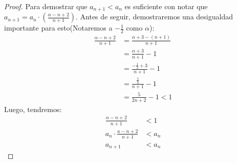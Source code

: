 \documentclass[../main.tex]{subfiles}
\begin{document}
\begin{partes}
\begin{proof}
        Para demostrar que $a_{n+1} < a_n$ es suficiente con notar que $a_{n+1} = a_n \cdot \left(\frac{\alpha-n+2}{n+1}\right)$. Antes de seguir, demostraremos una desigualdad importante para esto(Notaremos a $-\frac{1}{2}$ como $\alpha$):
        \begin{align*}
            \frac{\alpha-n+2}{n+1} &= \frac{\alpha+3 - (n+1)}{n+1}\\
            &= \frac{\alpha + 3}{n+1} - 1\\
            &= \frac{-\frac{1}{2}+ 3}{n+1} - 1\\
            &= \frac{\frac{5}{2}}{n+1} - 1\\
            &= \frac{5}{2n+2} - 1 < 1
        \end{align*}
        Luego, tendremos:
        \begin{align*}
            \frac{\alpha-n+2}{n+1} &< 1\\
            a_n \cdot \frac{a-n+2}{n+1} &< a_n\\
            a_{n+1} &< a_{n}
        \end{align*}
    \end{proof}
\end{partes}
\end{document}
